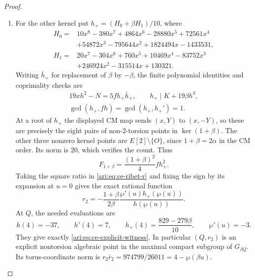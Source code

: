 \begin{proof}
\begin{enumerate}[label=\arabic*.,leftmargin=*]
\item For the other kernel put $h_+=(H_0+\beta H_1)/10$, where
\[
 \begin{aligned}
 H_0={}&10x^8-380x^7+4864x^6-28880x^5+72561x^4\\
       &+54872x^3-795644x^2+1824494x-1433531,\\
 H_1={}&20x^7-304x^6+760x^5+10469x^4-83752x^3\\
       &+246924x^2-315514x+130321.
 \end{aligned}
\]
Writing $\bar h_+$ for replacement of $\beta$ by $-\beta$,
the finite polynomial identities and coprimality checks are
\[
 \begin{gathered}
 19xh^2-N=5f h_+\bar h_+,\qquad
 h_+\mid K+19\beta h^3,\\
 \gcd(h_+,fh)=\gcd(h_+,h_+')=1.
 \end{gathered}
\]
At a root of $h_+$ the displayed CM map sends $(x,Y)$ to
$(x,-Y)$, so these are precisely the eight pairs of
non-$2$-torsion points in $\ker(1+\beta)$. The other three
nonzero kernel points are $E[2]\setminus\{O\}$, since
$1+\beta=2\alpha$ in the CM order. Its norm is $20$,
which verifies the count. Thus
\[
 F_{1+\beta}=\frac{(1+\beta)^2}{4}f h_+^2.
\]
Taking the square ratio in \eqref{ari:eq:ce-ribet-r} and fixing
the sign by its expansion at $u=0$ gives the exact rational
function
\[
 r_2=-\frac{1+\beta}{2\beta}\frac{\wp'(u)h_+(\wp(u))}
                                             {h(\wp(u))}.
\]
At $Q$, the needed evaluations are
\[
 h(4)=-37,\qquad h'(4)=7,\qquad
 h_+(4)=\frac{829-279\beta}{10},\qquad\wp'(u)=-3.
\]
They give exactly \eqref{ari:eq:ce-explicit-witness}. In
particular $(Q,r_2)$ is an explicit nontorsion algebraic
point in the maximal compact subgroup of $G_{\beta Q}$.
Its torus-coordinate norm is
$r_2\bar r_2=974799/26011=4-\wp(\beta u)$.

\end{enumerate}
\end{proof}